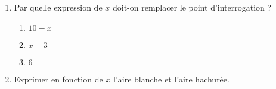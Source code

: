 
\begin{exercice}\label{exo2smath-0196}

\begin{center}                                                             
               
\end{center}

\begin{enumerate}
    \item
        Par quelle expression de \( x\) doit-on remplacer le point d'interrogation ?
        \begin{enumerate}
            \item
                \( 10-x\)
            \item
                \( x-3\)
            \item
                \( 6\)
        \end{enumerate}
    \item
        Exprimer en fonction de \( x\) l'aire blanche et l'aire hachurée.
\end{enumerate}

\end{exercice}

